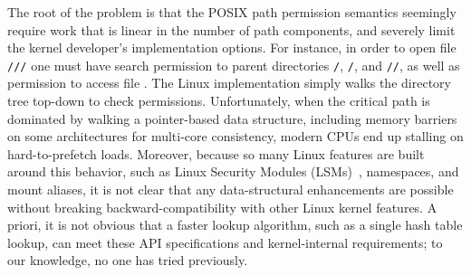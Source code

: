 The root of the problem is that the POSIX path permission semantics
seemingly require work that is linear in the number of path components,
and severely limit the kernel developer's implementation options.
For instance, in order to open file {\tt /\fnone{}/\fntwo{}/\fnthree{}} 
one must have search permission
to parent directories {\tt /}, {\tt /\fnone{}}, and {\tt /\fnone{}/\fntwo{}},
as well as permission to access file {\tt \fnthree{}}.
The Linux implementation %
simply walks the directory
tree top-down to check permissions.  
Unfortunately, when the critical path is dominated by 
walking a pointer-based data structure, 
including memory barriers on some architectures for multi-core consistency, 
modern CPUs end up stalling on hard-to-prefetch loads.
Moreover, because so many Linux features are built around this behavior, such as Linux Security Modules (LSMs)~\citep{wright+lsm},
namespaces, and mount aliases, it is not clear that any data-structural enhancements
are possible without breaking backward-compatibility with other Linux kernel features.
A priori, it is not obvious that a faster lookup algorithm, such as a single hash table lookup, 
can meet these API specifications and kernel-internal requirements; to our knowledge,
no one has tried previously.




